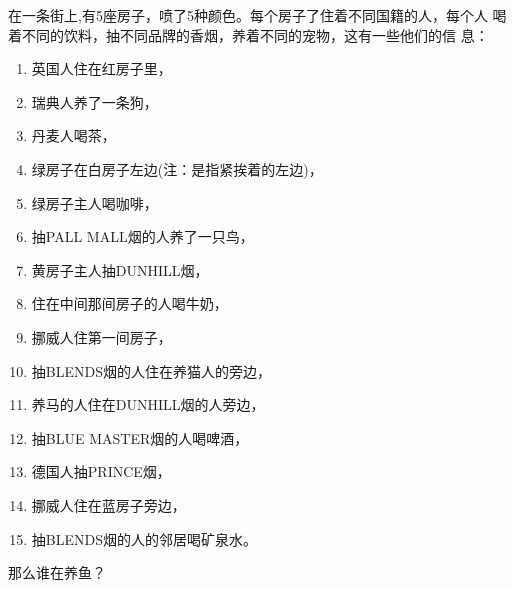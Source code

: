 \begin{example}[爱因斯坦难题]
  在一条街上,有5座房子，喷了5种颜色。每个房子了住着不同国籍的人，每个人
  喝着不同的饮料，抽不同品牌的香烟，养着不同的宠物，这有一些他们的信
  息：
  \begin{enumerate}
  \item 英国人住在红房子里，
  \item 瑞典人养了一条狗，
  \item 丹麦人喝茶，
  \item 绿房子在白房子左边(注：是指紧挨着的左边)，
  \item 绿房子主人喝咖啡，
  \item 抽PALL MALL烟的人养了一只鸟，
  \item 黄房子主人抽DUNHILL烟，
  \item 住在中间那间房子的人喝牛奶，
  \item 挪威人住第一间房子，
  \item 抽BLENDS烟的人住在养猫人的旁边，
  \item 养马的人住在DUNHILL烟的人旁边，
  \item 抽BLUE MASTER烟的人喝啤酒，
  \item 德国人抽PRINCE烟，
  \item 挪威人住在蓝房子旁边，
  \item 抽BLENDS烟的人的邻居喝矿泉水。
  \end{enumerate}
  那么谁在养鱼？
\end{example}
